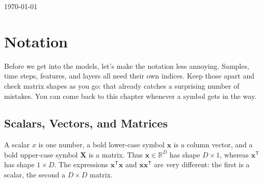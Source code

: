 \documentclass[11pt, oneside]{book}
\newcommand{\R}{\mathbb{R}}
\newcommand{\T}{^{\mathsf{T}}}           %
\let\originalsection\section
\renewcommand{\section}{\Needspace{7\baselineskip}\originalsection}
\begin{document}
\vfill
{\centering\small\color{gray!65} \today\par}
\clearpage


\setcounter{tocdepth}{2}  %

\begingroup
  \let\cleardoublepage\relax
  \let\clearpage\relax
  \tableofcontents
\endgroup


\mainmatter
\setcounter{chapter}{-1}

\chapter{Notation}\label{ch:source-0}

Before we get into the models, let's make the notation less annoying. Samples, time steps, features, and layers all need their own indices. Keep those apart and check matrix shapes as you go: that already catches a surprising number of mistakes. You can come back to this chapter whenever a symbol gets in the way.

\section{Scalars, Vectors, and Matrices}\label{sec:source-0-1}
A scalar $x$ is one number, a bold lower-case symbol $\mathbf{x}$ is a column vector, and a bold upper-case symbol $\mathbf{X}$ is a matrix. Thus $\mathbf{x}\in\R^D$ has shape $D\times1$, whereas $\mathbf{x}\T$ has shape $1\times D$. The expressions $\mathbf{x}\T\mathbf{x}$ and $\mathbf{x}\mathbf{x}\T$ are very different: the first is a scalar, the second a $D\times D$ matrix.
\end{document}
